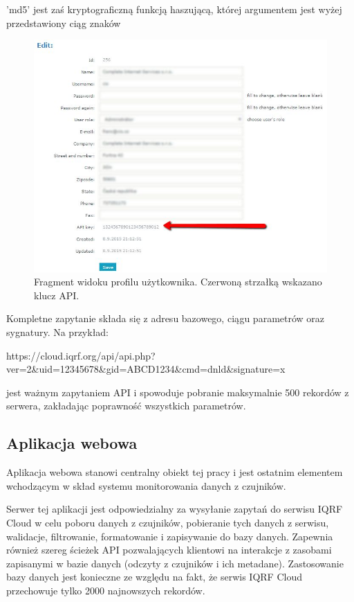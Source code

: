 'md5' jest zaś kryptograficzną funkcją haszującą, której argumentem jest wyżej przedstawiony ciąg znaków 


\begin{figure}[H]
    \includegraphics[width=\textwidth]{zdj/api-key.png}
    \caption{Fragment widoku profilu użytkownika. Czerwoną strzałką wskazano klucz API.}
    \label{api-key}
\end{figure}

Kompletne zapytanie składa się z adresu bazowego, ciągu parametrów oraz sygnatury. Na przykład:
\begin{center}
    \begin{small}
        https://cloud.iqrf.org/api/api.php?ver=2\&uid=12345678\&gid=ABCD1234\&cmd=dnld\&signature=x
    \end{small}
\end{center}

jest ważnym zapytaniem API i spowoduje pobranie maksymalnie 500 rekordów z serwera, zakładając poprawność wszystkich parametrów.

\subsection{Aplikacja webowa}

Aplikacja webowa stanowi centralny obiekt tej pracy i jest ostatnim elementem wchodzącym w skład systemu monitorowania danych
z czujników. 

Serwer tej aplikacji jest odpowiedzialny za wysyłanie zapytań do serwisu IQRF Cloud w celu poboru danych z czujników, pobieranie
tych danych z serwisu, walidacje, filtrowanie, formatowanie i zapisywanie do bazy danych. Zapewnia również szereg ścieżek API pozwalających
klientowi na interakcje z zasobami zapisanymi w bazie danych (odczyty z czujników i ich metadane). Zastosowanie bazy danych 
jest konieczne ze względu na fakt, że serwis IQRF Cloud przechowuje tylko 2000 najnowszych rekordów.

